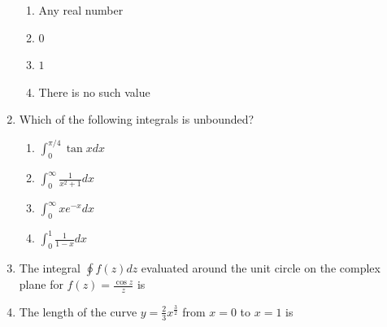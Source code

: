 \documentclass[journal,12pt,onecolumn]{IEEEtran}
\begin{document}
\begin{enumerate}[resume]
          \begin{enumerate}
              \item Any real number
              \item $0$
              \item $1$
              \item There is no such value
          \end{enumerate}

    \item Which of the following integrals is unbounded?
          \begin{enumerate}
              \item $\int_{0}^{\pi/4}{\tan x dx}$
              \item $\int_{0}^{\infty}{\frac{1}{x^2+1} dx}$
              \item $\int_{0}^{\infty}{xe^{-x} dx}$
              \item $\int_{0}^{1}{\frac{1}{1-x} dx}$
          \end{enumerate}

    \item The integral $\oint{f(z)dz}$ evaluated around the unit circle on the complex plane for $f(z) = \frac{\cos z}{z}$ is
          \begin{enumerate}
          \end{enumerate}

    \item The length of the curve $y=\frac{2}{3}x^{\frac{3}{2}}$ from $x=0$ to $x=1$ is
          \begin{enumerate}
          \end{enumerate}


\end{enumerate}
\end{document}
